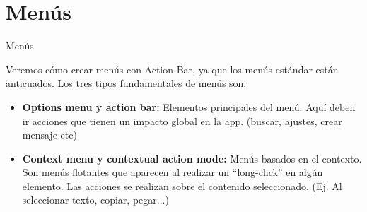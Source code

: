\section{Menús}
\begin{frame}{Menús}
    \begin{block}{}
        Veremos cómo crear menús con Action Bar, ya que los menús estándar
        están anticuados. Los tres tipos fundamentales de menús son:
    \end{block}
    \begin{itemize}
        \item {
            \textbf{Options menu y action bar:} Elementos principales del menú.
            Aquí deben ir acciones que tienen un impacto global en la app. (buscar, ajustes, crear mensaje etc)\pause
        }
        \item {
            \textbf{Context menu y contextual action mode:} Menús basados
            en el contexto. Son menús flotantes que aparecen al realizar un “long-click”
            en algún elemento. Las acciones se realizan sobre el contenido
            seleccionado. (Ej. Al seleccionar texto, copiar, pegar...)
        }
    \end{itemize}
\end{frame}
